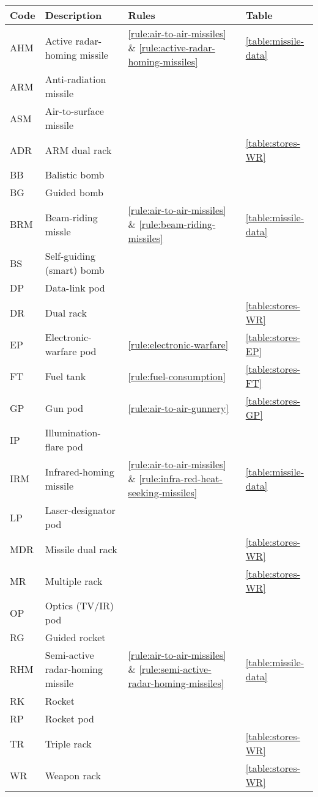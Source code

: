 \begin{twocolumntable}[t]

\begin{tabular}{llll}
\toprule
Code&Description&Rules&Table\\
\midrule
AHM&Active radar-homing missile&\ref{rule:air-to-air-missiles} \& \ref{rule:active-radar-homing-missiles}&\ref{table:missile-data}\\
ARM&Anti-radiation missile\\
ASM&Air-to-surface missile\\
ADR&ARM dual rack&&\ref{table:stores-WR}\\
BB&Balistic bomb\\
BG&Guided bomb\\
BRM&Beam-riding missle&\ref{rule:air-to-air-missiles} \& \ref{rule:beam-riding-missiles}&\ref{table:missile-data}\\
BS&Self-guiding (smart) bomb\\
DP&Data-link pod\\
DR&Dual rack&&\ref{table:stores-WR}\\
EP&Electronic-warfare pod&\ref{rule:electronic-warfare}&\ref{table:stores-EP}\\
FT&Fuel tank&\ref{rule:fuel-consumption}&\ref{table:stores-FT}\\
GP&Gun pod&\ref{rule:air-to-air-gunnery}&\ref{table:stores-GP}\\
IP&Illumination-flare pod\\
IRM&Infrared-homing missile&\ref{rule:air-to-air-missiles} \& \ref{rule:infra-red-heat-seeking-missiles}&\ref{table:missile-data}\\
LP&Laser-designator pod\\
MDR&Missile dual rack&&\ref{table:stores-WR}\\
MR&Multiple rack&&\ref{table:stores-WR}\\
OP&Optics (TV/IR) pod\\
RG&Guided rocket\\
RHM&Semi-active radar-homing missile&\ref{rule:air-to-air-missiles} \& \ref{rule:semi-active-radar-homing-missiles}&\ref{table:missile-data}\\
RK&Rocket\\
RP&Rocket pod\\
TR&Triple rack&&\ref{table:stores-WR}\\
WR&Weapon rack&&\ref{table:stores-WR}\\
\bottomrule
\end{tabular}

\end{twocolumntable}